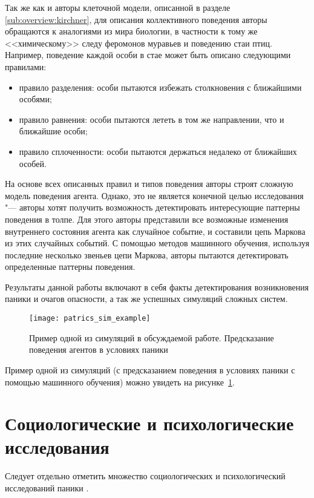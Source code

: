 Так же как и авторы клеточной модели, описанной в разделе \ref{sub:overview:kirchner}, для описания коллективного поведения авторы обращаются к аналогиями из мира биологии,
в частности к тому же <<химическому>> следу феромонов муравьев и поведению стаи птиц.
Например, поведение каждой особи в стае может быть описано следующими правилами:

\begin{itemize}
  \item правило разделения: особи пытаются избежать столкновения с ближайшими особями;
  \item правило равнения: особи пытаются лететь в том же направлении, что и ближайшие особи;
  \item правило сплоченности: особи пытаются держаться недалеко от ближайших особей.
\end{itemize}

На основе всех описанных правил и типов поведения авторы строят сложную модель поведения агента.
Однако, это не является конечной целью исследования "--- авторы хотят получить возможность детектировать интересующие паттерны поведения в толпе.
Для этого авторы представили все возможные изменения внутреннего состояния агента как случайное событие, и составили цепь Маркова из этих случайных событий.
С помощью методов машинного обучения, используя последние несколько звеньев цепи Маркова, авторы пытаются детектировать определенные паттерны поведения.

Результаты данной работы включают в себя факты детектирования возникновения паники и очагов опасности, а так же успешных симуляций сложных систем.

\begin{figure}[ht!]
  \centering
  \texttt{[image: patrics\_sim\_example]}
  \caption{Пример одной из симуляций в обсуждаемой работе. Предсказание поведения агентов в условиях паники}
  \label{sub:overview:patrics:sim_example}
\end{figure}

Пример одной из симуляций (с предсказанием поведения в условиях паники с помощью машинного обучения) можно увидеть на рисунке~\ref{sub:overview:patrics:sim_example}.


\section{Социологические и психологические исследования}
\label{sub:overview:soc}

Следует отдельно отметить множество социологических и психологический исследований паники \cite{guten1972likelihood} \cite{mawson2005understanding} \cite{quarantelli1975panic} \cite{quarantelli1999sociology} \cite{quarantelli2001sociology} \cite{quarantelli1979panic} \cite{robinette2011incorporating}.

